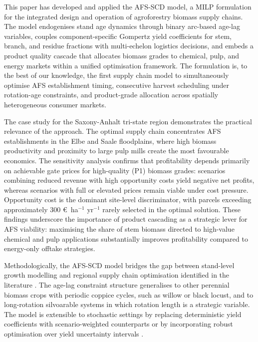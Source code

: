 \documentclass[preprint,review,1p,authoryear]{elsarticle} %
\newcommand{\euro}{€}
\begin{document}
This paper has developed and applied the AFS-SCD model, a MILP
formulation for the integrated design and operation of agroforestry
biomass supply chains. The model endogenises stand age dynamics through
binary arc-based age-lag variables, couples component-specific Gompertz
yield coefficients for stem, branch, and residue fractions with
multi-echelon logistics decisions, and embeds a product quality cascade
that allocates biomass grades to chemical, pulp, and energy markets
within a unified optimisation framework. The formulation is, to the best
of our knowledge, the first supply chain model to simultaneously
optimise AFS establishment timing, consecutive harvest scheduling under
rotation-age constraints, and product-grade allocation across spatially
heterogeneous consumer markets.

The case study for the Saxony-Anhalt tri-state region demonstrates the
practical relevance of the approach. The optimal supply chain
concentrates AFS establishments in the Elbe and Saale floodplains,
where high biomass productivity and proximity to large pulp mills create
the most favourable economics. The sensitivity analysis confirms that
profitability depends primarily on achievable gate prices for
high-quality (P1) biomass grades: scenarios combining reduced revenue
with high opportunity costs yield negative net profits, whereas
scenarios with full or elevated prices remain viable under cost pressure.
Opportunity cost is the dominant site-level discriminator, with parcels
exceeding approximately 300 \euro~ha\(^{-1}\) yr\(^{-1}\) rarely selected
in the optimal solution. These findings underscore the importance of
product cascading as a strategic lever for AFS viability: maximising
the share of stem biomass directed to high-value chemical and pulp
applications substantially improves profitability compared to
energy-only offtake strategies.

Methodologically, the AFS-SCD model bridges the gap between stand-level
growth modelling and regional supply chain optimisation identified in
the literature \citep{Zahraee2020_BSC_review, Lamers2015_Feedstock_Design}.
The age-lag constraint structure generalises to other perennial biomass
crops with periodic coppice cycles, such as willow or black locust, and
to long-rotation silvoarable systems in which rotation length is a
strategic variable. The model is extensible to stochastic settings by
replacing deterministic yield coefficients with scenario-weighted
counterparts or by incorporating robust optimisation over yield
uncertainty intervals \citep{Sharma2013_BSC_review}.
\end{document}
